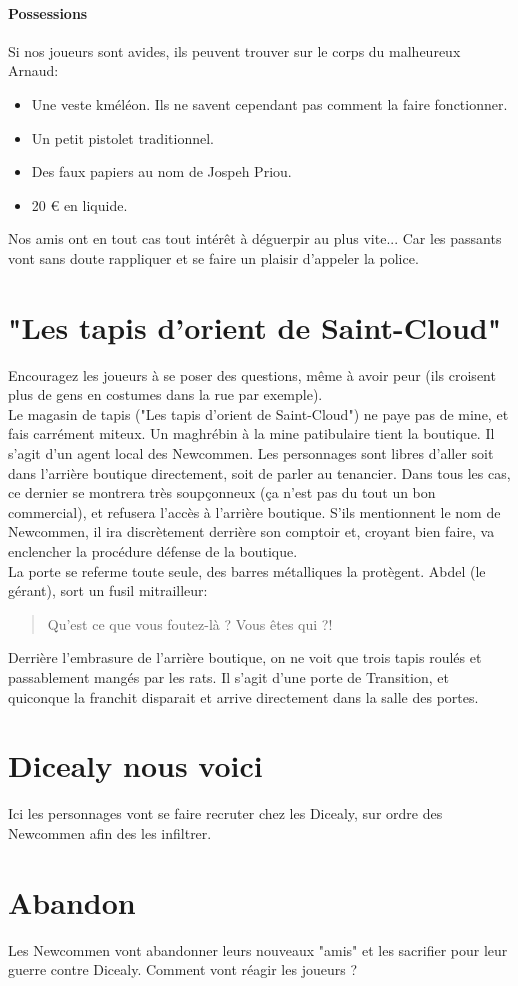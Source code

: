 \documentclass[10pt,a4paper,twocolumn]{article}
\begin{document}
\paragraph*{Possessions}
Si nos joueurs sont avides, ils peuvent trouver sur le corps du malheureux Arnaud:
\begin{itemize}
	\item Une veste kméléon. Ils ne savent cependant pas comment la faire fonctionner.
	\item Un petit pistolet traditionnel.
	\item Des faux papiers au nom de Jospeh Priou.
	\item 20 € en liquide.
\end{itemize}
Nos amis ont en tout cas tout intérêt à déguerpir au plus vite... Car les passants vont sans doute rappliquer et se faire un plaisir d'appeler la police.
\section{"Les tapis d'orient de Saint-Cloud"}
Encouragez les joueurs à se poser des questions, même à avoir peur (ils croisent plus de gens en costumes dans la rue par exemple). \\
Le magasin de tapis ("Les tapis d'orient de Saint-Cloud") ne paye pas de mine, et fais carrément miteux. Un maghrébin à la mine patibulaire tient la boutique. Il s'agit d'un agent local des Newcommen. Les personnages sont libres d'aller soit dans l'arrière boutique directement, soit de parler au tenancier. Dans tous les cas, ce dernier se montrera très soupçonneux (ça n'est pas du tout un bon commercial), et refusera l'accès à l'arrière boutique. S'ils mentionnent le nom de Newcommen, il ira discrètement derrière son comptoir et, croyant bien faire, va enclencher la procédure défense de la boutique.\\
La porte se referme toute seule, des barres métalliques la protègent. Abdel (le gérant), sort un fusil mitrailleur:
\begin{quote}
Qu'est ce que vous foutez-là ? Vous êtes qui ?!
\end{quote}

Derrière l'embrasure de l'arrière boutique, on ne voit que trois tapis roulés et passablement mangés par les rats. Il s'agit d'une porte de Transition, et quiconque la franchit disparait et arrive directement dans la salle des portes.

\section{Dicealy nous voici}
Ici les personnages vont se faire recruter chez les Dicealy, sur ordre des Newcommen afin des les infiltrer.

\section{Abandon}
Les Newcommen vont abandonner leurs nouveaux "amis" et les sacrifier pour leur guerre contre Dicealy. Comment vont réagir les joueurs ?
\end{document}
